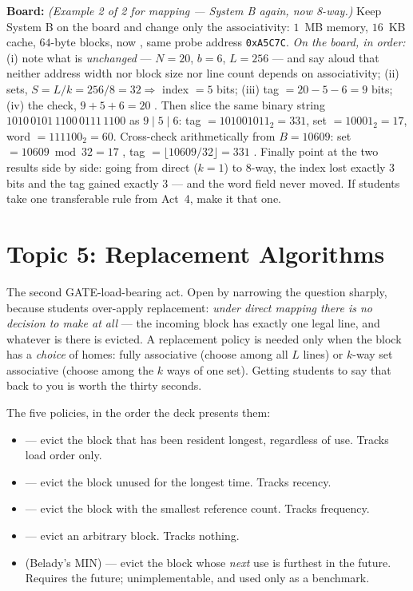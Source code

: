 \documentclass[11pt]{article}
\begin{document}
\textbf{Board:} \textit{(Example 2 of 2 for mapping --- System B again, now 8-way.)} Keep System B on the board and change only the associativity: $1$~MB memory, $16$~KB cache, $64$-byte blocks, now , same probe address \texttt{0xA5C7C}. \emph{On the board, in order:} (i) note what is \emph{unchanged} --- $N = 20$, $b = 6$, $L = 256$ --- and say aloud that neither address width nor block size nor line count depends on associativity; (ii) sets, $S = L/k = 256/8 = 32 \Rightarrow$ index $= 5$ bits; (iii) tag $= 20 - 5 - 6 = 9$ bits; (iv) the check, $9 + 5 + 6 = 20$ \good{\checkmark}. Then slice the same binary string $1010\,0101\,1100\,0111\,1100$ as $9\mid 5\mid 6$: tag $= 101001011_2 = 331$, set $= 10001_2 = 17$, word $= 111100_2 = 60$. Cross-check arithmetically from $B = 10609$: set $= 10609 \bmod 32 = 17$ \good{\checkmark}, tag $= \lfloor 10609/32 \rfloor = 331$ \good{\checkmark}. Finally point at the two results side by side: going from direct ($k=1$) to 8-way, the index lost exactly $3$ bits and the tag gained exactly $3$ --- and the word field never moved.  If students take one transferable rule from Act~4, make it that one.

\section{Topic 5: Replacement Algorithms}

The second GATE-load-bearing act. Open by narrowing the question sharply, because students over-apply replacement: \emph{under direct mapping there is no decision to make at all} --- the incoming block has exactly one legal line, and whatever is there is evicted. A replacement policy is needed only when the block has a \emph{choice} of homes: fully associative (choose among all $L$ lines) or $k$-way set associative (choose among the $k$ ways of one set). Getting students to say that back to you is worth the thirty seconds.

The five policies, in the order the deck presents them:

\begin{itemize}
  \item {} --- evict the block that has been resident longest, regardless of use. Tracks load order only.
  \item {} --- evict the block unused for the longest time. Tracks recency.
  \item {} --- evict the block with the smallest reference count. Tracks frequency.
  \item {} --- evict an arbitrary block. Tracks nothing.
  \item {} (Belady's MIN) --- evict the block whose \emph{next} use is furthest in the future. Requires the future; unimplementable, and used only as a benchmark.
\end{itemize}
\end{document}
